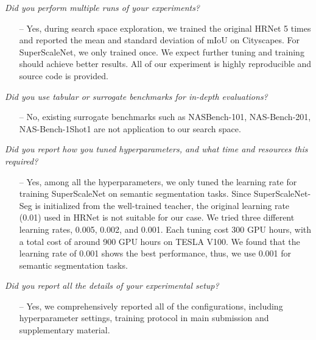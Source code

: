 \documentclass[final]{cvpr}
\newcommand{\supernet}{SuperScaleNet\xspace}
\begin{document}
\begin{todolist}
    \item[\done] \textit{Did you perform multiple runs of your experiments?} 
    \begin{itemize}
        \item [--]  Yes, during search space exploration, we trained the original HRNet 5 times and reported the mean and standard deviation of mIoU on Cityscapes. For  \supernet, we only trained once. We expect further tuning and training should achieve better results. 
    All of our experiment is highly reproducible and source code is provided.
    \end{itemize}

    \item \textit{Did you use tabular or surrogate benchmarks for in-depth evaluations?} 
        \begin{itemize}
            \item [--] No, existing surrogate benchmarks such as NASBench-101, NAS-Bench-201, NAS-Bench-1Shot1 are not application to our search space.
        \end{itemize}
    \item[\done] \textit{Did you report how you tuned hyperparameters, and what time and resources this required?} 
    \begin{itemize}
        \item [--] Yes, among all the hyperparameters, we only tuned the learning rate for training \supernet on semantic segmentation tasks. Since \supernet-Seg is initialized from the well-trained teacher, the original learning rate (0.01) used in HRNet is not suitable for our case. We tried three different learning rates, 0.005, 0.002, and 0.001. Each tuning cost 300 GPU hours, with a total cost of around 900 GPU hours on TESLA V100. 
        We found that the learning rate of 0.001 shows the best performance, thus, we use 0.001 for semantic segmentation tasks.
    \end{itemize}

    \item[\done] \textit{Did you report all the details of your experimental setup?} 
    \begin{itemize}
        \item [--] Yes, we comprehensively reported all of the configurations, including hyperparameter settings, training protocol in main submission and supplementary material. 
    \end{itemize}
    
\end{todolist}
 
\end{document}
